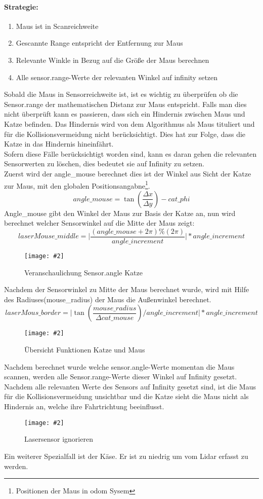 \documentclass[
a4paper,     %
12pt         %
]{scrartcl}  %
\newcommand{\mygraphics}[3]{
\begin{figure}[!h]
  \begin{center}
    \texttt{[image: \#2]} \\
    \caption{#3}\label{fig:#2}
  \end{center}
\end{figure}

}
\begin{document}
\paragraph{Strategie:}
\begin{enumerate}
\item Maus ist in Scanreichweite
\item Gescannte Range entspricht der Entfernung zur Maus
\item Relevante Winkle in Bezug auf die Größe der Maus berechnen
\item Alle sensor.range-Werte der relevanten Winkel auf infinity setzen
\end{enumerate}
Sobald die Maus in Sensorreichweite ist, ist es wichtig zu überprüfen ob die Sensor.range der mathematischen Distanz zur Maus entspricht. Falls man dies nicht überprüft kann es passieren, dass sich ein Hindernis zwischen Maus und Katze befinden. Das Hindernis wird von dem Algorithmus als Maus tituliert und für die Kollisionsvermeidung nicht berücksichtigt. Dies hat zur Folge, dass die Katze in das Hindernis hineinfährt.\\
Sofern diese Fälle berücksichtigt worden sind, kann es daran gehen die relevanten Sensorwerten zu löschen, dies bedeutet sie auf Infinity zu setzen. \\
Zuerst wird der angle\_mouse berechnet dies ist der Winkel aus Sicht der Katze zur Maus, mit den globalen Positionsangabne\footnote{Positionen der Maus in odom Sysem}.
\[ angle\_mouse=\tan( \frac{\Delta x}{\Delta y} ) -cat\_phi \]
Angle\_mouse gibt den Winkel der Maus zur Basis der Katze an, nun wird berechnet welcher Sensorwinkel auf die Mitte der Maus zeigt:
\[ laserMouse\_middle  =  \vert \frac{ (angle\_mouse + 2  \pi) \% (2 \pi)}{angle\_increment}  \vert * angle\_increment \]
\mygraphics{0.5\textwidth}{collisionANGLE2.png}{Veranschaulichung Sensor.angle Katze}
Nachdem der Sensorwinkel zu Mitte der Maus berechnet wurde, wird mit Hilfe des Radiuses(mouse\_radius) der Maus die Außenwinkel berechnet.
\[
laserMous\_border =  \vert { \tan( \frac{mouse\_radius}{\Delta cat\_mouse} ) } / angle\_increment \vert  * angle\_increment \]
\hspace*{0.63\textwidth}
\mygraphics{0.5\textwidth}{catmous.png}{Übersicht Funktionen Katze und Maus}
Nachdem berechnet wurde welche sensor.angle-Werte momentan die Maus scannen, werden alle Sensor.range-Werte dieser Winkel auf Infinity gesetzt. Nachdem alle relevanten Werte des     Sensors auf Infinity gesetzt sind, ist die Maus für die Kollisionsvermeidung unsichtbar und die Katze sieht die Maus nicht als Hindernis an, welche ihre Fahrtrichtung beeinflusst.\\
\mygraphics{0.5\textwidth}{collisionMOUS.png}{Lasersensor ignorieren }
Ein weiterer Spezialfall ist der Käse. Er ist zu niedrig um vom Lidar erfasst zu werden.
\end{document}
